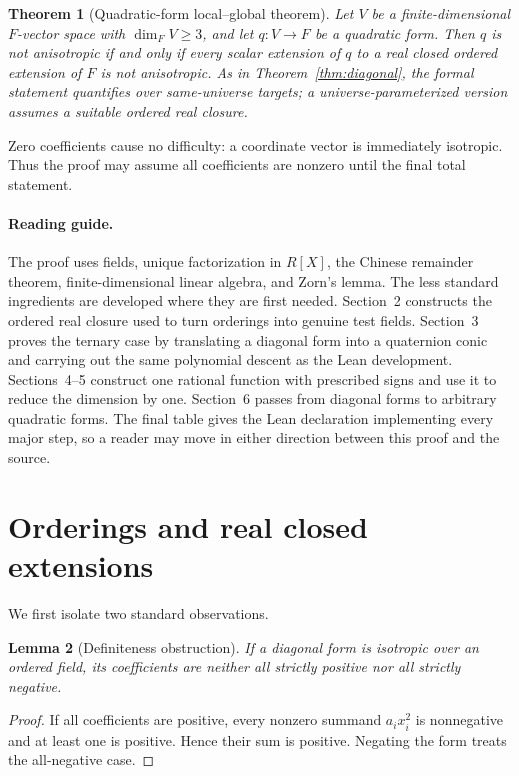 \documentclass[uplatex,dvipdfmx]{jsarticle}
\newtheorem{theorem}{Theorem}
\newtheorem{lemma}[theorem]{Lemma}
\theoremstyle{definition}
\theoremstyle{remark}
\begin{document}
\begin{theorem}[Quadratic-form local--global theorem]\label{thm:qf}
Let $V$ be a finite-dimensional $F$-vector space with
$\dim_F V\ge3$, and let $q:V\to F$ be a quadratic form.  Then $q$ is not
anisotropic if and only if every scalar extension of $q$ to a real closed
ordered extension of $F$ is not anisotropic.
As in Theorem~\ref{thm:diagonal}, the formal statement quantifies over
same-universe targets; a universe-parameterized version assumes a suitable
ordered real closure.
\end{theorem}

Zero coefficients cause no difficulty: a coordinate vector is immediately
isotropic.  Thus the proof may assume all coefficients are nonzero until the
final total statement.

\paragraph{Reading guide.}
The proof uses fields, unique
factorization in $R[X]$, the Chinese remainder theorem, finite-dimensional
linear algebra, and Zorn's lemma.  The less standard ingredients are developed
where they are first needed.  Section~2 constructs the ordered real closure
used to turn orderings into genuine test fields.  Section~3 proves the ternary
case by translating a diagonal form into a quaternion conic and carrying out
the same polynomial descent as the Lean development.  Sections~4--5 construct
one rational function with prescribed signs and use it to reduce the dimension
by one.  Section~6 passes from diagonal forms to arbitrary quadratic forms.
The final table gives the Lean declaration implementing every major step, so a
reader may move in either direction between this proof and the source.

\section{Orderings and real closed extensions}

We first isolate two standard observations.

\begin{lemma}[Definiteness obstruction]\label{lem:definite}
If a diagonal form is isotropic over an ordered field, its coefficients
are neither all strictly positive nor all strictly negative.
\end{lemma}
\begin{proof}
If all coefficients are positive, every nonzero summand $a_i x_i^2$ is
nonnegative and at least one is positive.  Hence their sum is positive.
Negating the form treats the all-negative case.
\end{proof}
\end{document}
